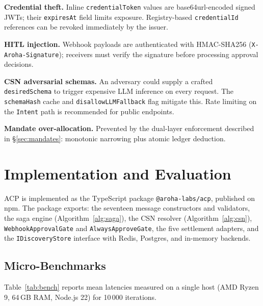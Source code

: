 \documentclass[conference]{IEEEtran}
\begin{document}
\textbf{Credential theft.}  Inline \texttt{credentialToken} values
are base64url-encoded signed JWTs; their \texttt{expiresAt} field
limits exposure.  Registry-based \texttt{credentialId} references
can be revoked immediately by the issuer.

\textbf{HITL injection.}  Webhook payloads are authenticated with
HMAC-SHA256 (\texttt{X-Aroha-Signature}); receivers must verify
the signature before processing approval decisions.

\textbf{CSN adversarial schemas.}  An adversary could supply a
crafted \texttt{desiredSchema} to trigger expensive LLM inference
on every request.  The \texttt{schemaHash} cache and
\texttt{disallowLLMFallback} flag mitigate this.  Rate limiting
on the \texttt{Intent} path is recommended for public endpoints.

\textbf{Mandate over-allocation.}  Prevented by the dual-layer
enforcement described in \S\ref{sec:mandates}: monotonic narrowing
plus atomic ledger deduction.

\section{Implementation and Evaluation}
\label{sec:impl}

ACP is implemented as the TypeScript package
\texttt{@aroha-labs/acp}, published on npm.  The package exports:
the seventeen message constructors and validators, the saga engine
(Algorithm~\ref{alg:saga}), the CSN resolver
(Algorithm~\ref{alg:csn}), \texttt{WebhookApprovalGate} and
\texttt{AlwaysApproveGate}, the five settlement adapters, and the
\texttt{IDiscoveryStore} interface with Redis, Postgres, and
in-memory backends.

\subsection{Micro-Benchmarks}

Table~\ref{tab:bench} reports mean latencies measured on a
single host (AMD Ryzen 9, 64\,GB RAM, Node.js 22) for 10\,000
iterations.
\end{document}
